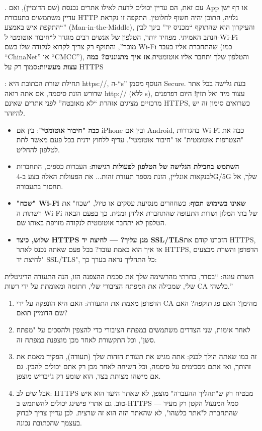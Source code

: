 . עם זאת, הם עדיין יכולים לדעת לאילו אתרים נכנסת (שם הדומיין), ואם App או דף ישן עדיין משתמשים בתעבורת HTTP גלויה, התוכן יהיה חשוף לחלוטין. התקפה זו נקראת “התקפת איש באמצע” (Man-in-the-Middle), והעיקרון הוא שהתוקף “מכניס יד” בינך לבין הנתב האמיתי. מפחיד יותר, הטלפון של אנשים רבים מוגדר ל“חיבור אוטומטי ל-Wi-Fi מוכר”, והתוקף רק צריך לקרוא לנקודה שלו בשם Wi-Fi שהתחברת אליו בעבר (כמו “ChinaNet” או “CMCC”), והטלפון שלך יתחבר אליו אוטומטית.\textbf{אז איך מתגוננים? כמה עצות מעשיות:}סמוך רק על HTTPS

: תחילת שורת הכתובת היא https://, ה-“s” הנוסף מסמן Secure. בעת גלישה בכל אתר שדורש הזנת סיסמה, אם אתה רואה http:// (ללא s), עצור מיד ואל תזין! היום דפדפנים מרכזיים מציגים אזהרת “לא מאובטח” לפני אתרים שאינם HTTPS, כשרואים סימון זה יש להיזהר.

\begin{itemize}
  \item \textbf{כבה "חיבור אוטומטי"}: בין אם iPhone ובין אם Android, בהגדרות Wi-Fi כבה את "הצטרפות אוטומטית" או "חיבור אוטומטי". עדיף ללחוץ ידנית בכל פעם מאשר לתת לטלפון להחליט.
  \item \textbf{השתמש בחבילת הגלישה של הטלפון לפעולות רגישות}: העברות כספים, התחברות לבנקאות אונליין, הזנת מספר תעודת זהות... את הפעולות האלה בצע ב-4G/5G שלך, אל תחסוך בתעבורה.
  \item \textbf{"שכח" Wi-Fi שאינו בשימוש תכוף}: כשחוזרים מנסיעת עסקים או טיול, "שכח" את רשתות ה-Wi-Fi של בתי המלון ושדות התעופה שהתחברת אליהן זמנית. כך בפעם הבאה הטלפון לא יתחבר אוטומטית לנקודה מזויפת באותו שם.
  \item \textbf{שלוש, כיצד HTTPS מגן עליך? — לחיצת יד SSL/TLS}הזכרנו קודם את HTTPS, אז איך הוא באמת עובד? בכל פעם שאתה נכנס לאתר HTTPS, הדפדפן והשרת מבצעים "לחיצת יד SSL/TLS", כל התהליך נראה בערך כך:
\end{itemize}


השרת עונה: “בסדר, בחרתי מהרשימה שלך את סכמת ההצפנה הזו, הנה התעודה הדיגיטלית שלי, שמכילה את המפתח הציבורי שלי, חתומה ומאומתת על ידי רשות CA כלשהי.”

\begin{enumerate}
  \item הדפדפן מאמת את התעודה: האם היא הונפקה על ידי CA מהימן? האם פג תוקפה? האם שם הדומיין תואם?
  \item לאחר אימות, שני הצדדים משתמשים במפתח הציבורי כדי להצפין ולהסכים על "מפתח סשן", וכל התקשורת לאחר מכן מוצפנת במפתח זה.
  \item זה כמו שאתה הולך לבנק: אתה מגיש את תעודת הזהות שלך (תעודה), הפקיד מאמת את זהותך, ואז אתם מסכימים על סיסמה, וכל השיחה לאחר מכן רק אתם יכולים להבין. גם אם מישהו מצותת בצד, הוא שומע רק ג'יבריש מוצפן.
  \item אבל שים לב: HTTPS מבטיח רק ש"תהליך ההעברה" מוצפן, לא שאתר היעד הוא איש טוב. גם אתרי פישינג יכולים להשתמש ב-HTTPS — סמל המנעול הקטן רק מעיד שהתחברת ל"אתר כלשהו", לא שהאתר הזה הוא זה שרצית. לכן עדיין צריך לבדוק בעצמך שהכתובת נכונה.
\end{enumerate}

